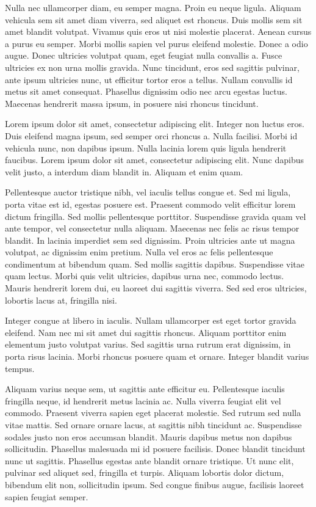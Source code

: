 Nulla nec ullamcorper diam, eu semper magna. Proin eu neque ligula. Aliquam vehicula sem sit amet diam viverra, sed aliquet est rhoncus. Duis mollis sem sit amet blandit volutpat. Vivamus quis eros ut nisi molestie placerat. Aenean cursus a purus eu semper. Morbi mollis sapien vel purus eleifend molestie. Donec a odio augue. Donec ultricies volutpat quam, eget feugiat nulla convallis a. Fusce ultricies ex non urna mollis gravida. Nunc tincidunt, eros sed sagittis pulvinar, ante ipsum ultricies nunc, ut efficitur tortor eros a tellus. Nullam convallis id metus sit amet consequat. Phasellus dignissim odio nec arcu egestas luctus. Maecenas hendrerit massa ipsum, in posuere nisi rhoncus tincidunt.

Lorem ipsum dolor sit amet, consectetur adipiscing elit. Integer non luctus eros. Duis eleifend magna ipsum, sed semper orci rhoncus a. Nulla facilisi. Morbi id vehicula nunc, non dapibus ipsum. Nulla lacinia lorem quis ligula hendrerit faucibus. Lorem ipsum dolor sit amet, consectetur adipiscing elit. Nunc dapibus velit justo, a interdum diam blandit in. Aliquam et enim quam.

Pellentesque auctor tristique nibh, vel iaculis tellus congue et. Sed mi ligula, porta vitae est id, egestas posuere est. Praesent commodo velit efficitur lorem dictum fringilla. Sed mollis pellentesque porttitor. Suspendisse gravida quam vel ante tempor, vel consectetur nulla aliquam. Maecenas nec felis ac risus tempor blandit. In lacinia imperdiet sem sed dignissim. Proin ultricies ante ut magna volutpat, ac dignissim enim pretium. Nulla vel eros ac felis pellentesque condimentum at bibendum quam. Sed mollis sagittis dapibus. Suspendisse vitae quam lectus. Morbi quis velit ultricies, dapibus urna nec, commodo lectus. Mauris hendrerit lorem dui, eu laoreet dui sagittis viverra. Sed sed eros ultricies, lobortis lacus at, fringilla nisi.

Integer congue at libero in iaculis. Nullam ullamcorper est eget tortor gravida eleifend. Nam nec mi sit amet dui sagittis rhoncus. Aliquam porttitor enim elementum justo volutpat varius. Sed sagittis urna rutrum erat dignissim, in porta risus lacinia. Morbi rhoncus posuere quam et ornare. Integer blandit varius tempus.

Aliquam varius neque sem, ut sagittis ante efficitur eu. Pellentesque iaculis fringilla neque, id hendrerit metus lacinia ac. Nulla viverra feugiat elit vel commodo. Praesent viverra sapien eget placerat molestie. Sed rutrum sed nulla vitae mattis. Sed ornare ornare lacus, at sagittis nibh tincidunt ac. Suspendisse sodales justo non eros accumsan blandit. Mauris dapibus metus non dapibus sollicitudin. Phasellus malesuada mi id posuere facilisis. Donec blandit tincidunt nunc ut sagittis. Phasellus egestas ante blandit ornare tristique. Ut nunc elit, pulvinar sed aliquet sed, fringilla et turpis. Aliquam lobortis dolor dictum, bibendum elit non, sollicitudin ipsum. Sed congue finibus augue, facilisis laoreet sapien feugiat semper.

